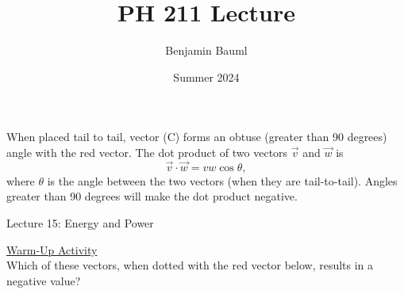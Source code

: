 \documentclass[]{article}
\title{PH 211 Lecture \Week}
\author{Benjamin Bauml}
\date{Summer 2024}
\newcommand{\Week}{15}
\begin{document}
\begin{TeacherMargin}
\noindent When placed tail to tail, vector (C) forms an obtuse (greater than 90 degrees) angle with the red vector. The dot product of two vectors $\vec{v}$ and $\vec{w}$ is
\[
\vec{v}\cdot\vec{w} = vw\cos\theta,
\]
where $\theta$ is the angle between the two vectors (when they are tail-to-tail). Angles greater than 90 degrees will make the dot product negative.
\end{TeacherMargin}
\begin{PresentSpace}
\begin{center}
	\huge Lecture \Week: Energy and Power
\end{center}
\vspace{0.5cm}
\underline{Warm-Up Activity} \\
Which of these vectors, when dotted with the red vector below, results in a negative value? \\
\end{PresentSpace}
\newpage
\end{document}
